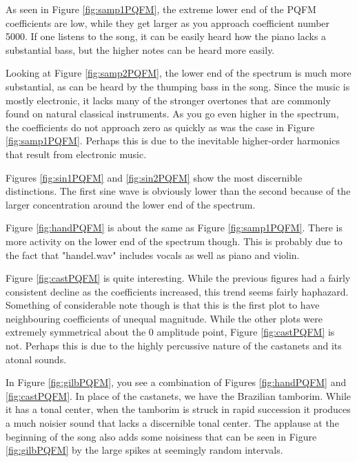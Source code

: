 \documentclass{article} %
\begin{document}
As seen in Figure \ref{fig:samp1PQFM}, the extreme lower end of the PQFM
coefficients are low, while they get larger as you approach coefficient number
5000. If one listens to the song, it can be easily heard how the piano lacks
a substantial bass, but the higher notes can be heard more easily. 

Looking at Figure \ref{fig:samp2PQFM}, the lower end of the spectrum is much
more substantial, as can be heard by the thumping bass in the song. Since the
music is mostly electronic, it lacks many of the stronger overtones that are
commonly found on natural classical instruments. As you go even higher in the
spectrum, the coefficients do not approach zero as quickly as was the case
in Figure \ref{fig:samp1PQFM}. Perhaps this is due to the inevitable 
higher-order harmonics that result from electronic music. 

Figures \ref{fig:sin1PQFM} and \ref{fig:sin2PQFM} show the most discernible
distinctions. The first sine wave is obviously lower than the second because
of the larger concentration around the lower end of the spectrum. 

Figure \ref{fig:handPQFM} is about the same as Figure \ref{fig:samp1PQFM}. There
is more activity on the lower end of the spectrum though. This is probably due
to the fact that "handel.wav" includes vocals as well as piano and violin. 


Figure \ref{fig:castPQFM} is quite interesting. While the previous figures had
a fairly consistent decline as the coefficients increased, this trend
seems fairly haphazard. Something of considerable note though is that
this is the first plot to have neighbouring coefficients of unequal magnitude.
While the other plots were extremely symmetrical about the 0 amplitude point, 
Figure \ref{fig:castPQFM} is not. Perhaps this is due to the highly percussive
nature of the castanets and its atonal sounds. 

In Figure \ref{fig:gilbPQFM}, you see a combination of Figures \ref{fig:handPQFM}
and \ref{fig:castPQFM}. In place of the castanets, we have the Brazilian 
tamborim. While it has a tonal center, when the tamborim is struck in rapid
succession it produces a much noisier sound that lacks a discernible tonal
center. The applause at the beginning of the song also adds some noisiness
that can be seen in Figure \ref{fig:gilbPQFM} by the large spikes at seemingly
random intervals. 


\end{document}
